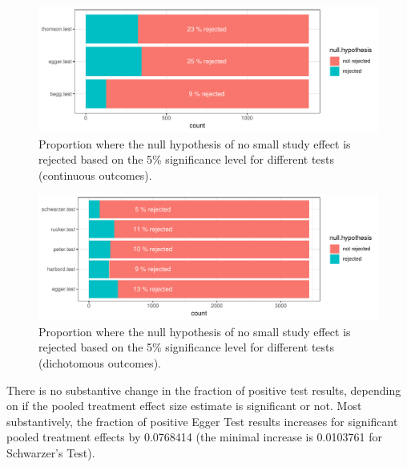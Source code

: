 \documentclass[11pt,a4paper,twoside]{book}\usepackage[]{graphicx}\usepackage[]{color}
\newenvironment{knitrout}{}{} %
\begin{document}
\begin{figure}
\begin{knitrout}
\color{fgcolor}

{\centering \includegraphics[width=\textwidth-3cm]{figure/ch02_figunnamed-chunk-19-1} 

}



\end{knitrout}
\caption{Proportion where the null hypothesis of no small study effect is rejected based on the 5\% significance level for different tests (continuous outcomes).}
\label{bias.results.cont}
\end{figure}

\begin{figure}
\begin{knitrout}
\color{fgcolor}

{\centering \includegraphics[width=\textwidth-3cm]{figure/ch02_figunnamed-chunk-20-1} 

}



\end{knitrout}
\caption{Proportion where the null hypothesis of no small study effect is rejected based on the 5\% significance level for different tests (dichotomous outcomes).}
\label{bias.results.bin}
\end{figure}

There is no substantive change in the fraction of positive test results, depending on if the pooled treatment effect size estimate is significant or not. Most substantively, the fraction of positive Egger Test results increases for significant pooled treatment effects by 0.0768414 (the minimal increase is 0.0103761 for Schwarzer's Test).
\end{document}
